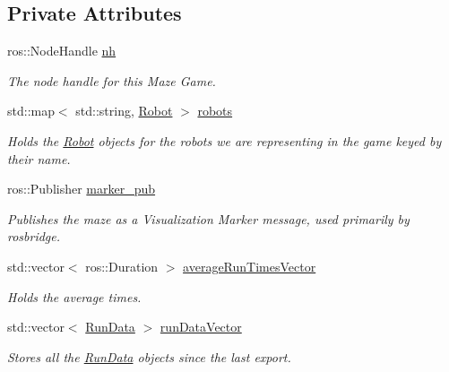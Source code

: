 \subsection*{Private Attributes}
\begin{DoxyCompactItemize}
\item 
\hypertarget{classGameModel_ac5eefdf8774b8638dce8fb124ae87ad7}{ros\-::\-Node\-Handle \hyperlink{classGameModel_ac5eefdf8774b8638dce8fb124ae87ad7}{nh}}\label{classGameModel_ac5eefdf8774b8638dce8fb124ae87ad7}

\begin{DoxyCompactList}\small\item\em The node handle for this Maze Game. \end{DoxyCompactList}\item 
\hypertarget{classGameModel_a9f690e3616752d460d57b2e961870278}{std\-::map$<$ std\-::string, \hyperlink{classRobot}{Robot} $>$ \hyperlink{classGameModel_a9f690e3616752d460d57b2e961870278}{robots}}\label{classGameModel_a9f690e3616752d460d57b2e961870278}

\begin{DoxyCompactList}\small\item\em Holds the \hyperlink{classRobot}{Robot} objects for the robots we are representing in the game keyed by their name. \end{DoxyCompactList}\item 
\hypertarget{classGameModel_af9b2926734b8760c2bf15455babdfec8}{ros\-::\-Publisher \hyperlink{classGameModel_af9b2926734b8760c2bf15455babdfec8}{marker\-\_\-pub}}\label{classGameModel_af9b2926734b8760c2bf15455babdfec8}

\begin{DoxyCompactList}\small\item\em Publishes the maze as a Visualization Marker message, used primarily by rosbridge. \end{DoxyCompactList}\item 
\hypertarget{classGameModel_a7901521cc05255f36939d726db7b72b0}{std\-::vector$<$ ros\-::\-Duration $>$ \hyperlink{classGameModel_a7901521cc05255f36939d726db7b72b0}{average\-Run\-Times\-Vector}}\label{classGameModel_a7901521cc05255f36939d726db7b72b0}

\begin{DoxyCompactList}\small\item\em Holds the average times. \end{DoxyCompactList}\item 
\hypertarget{classGameModel_a3088b82e8e8178045718c2f24f605791}{std\-::vector$<$ \hyperlink{structGameModel_1_1RunData}{Run\-Data} $>$ \hyperlink{classGameModel_a3088b82e8e8178045718c2f24f605791}{run\-Data\-Vector}}\label{classGameModel_a3088b82e8e8178045718c2f24f605791}

\begin{DoxyCompactList}\small\item\em Stores all the \hyperlink{structGameModel_1_1RunData}{Run\-Data} objects since the last export. \end{DoxyCompactList}\end{DoxyCompactItemize}


